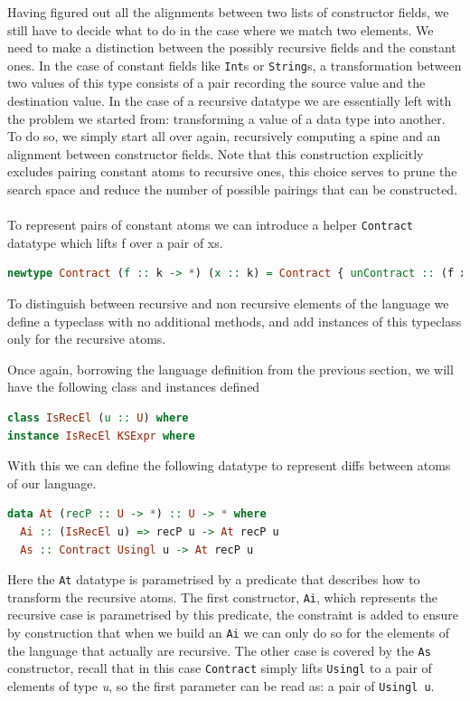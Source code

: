 \documentclass[11pt]{article}
\begin{document}
Having figured out all the alignments between two lists of constructor
fields, we still have to decide what to do in the case where we match two
elements. We need to make a distinction between the possibly
recursive fields and the constant ones.
In the case of constant fields
like \texttt{Int}s or \texttt{String}s, a transformation between two
values of this type consists of a pair recording the source value and the
destination value. In the case of a recursive datatype we are
essentially left with the problem we started from: transforming a value
of a data type into another. To do so, we simply start all over again,
recursively computing a spine and an alignment between constructor
fields. Note that this construction explicitly excludes pairing constant atoms 
to recursive ones, this choice serves to prune the search space and reduce the 
number of possible pairings that can be constructed.
\\\\
To represent pairs of constant atoms we can introduce a helper \texttt{Contract} datatype which 
lifts f over a pair of xs.

\begin{lstlisting}[language=haskell]
  newtype Contract (f :: k -> *) (x :: k) = Contract { unContract :: (f x , f x) }
\end{lstlisting}

To distinguish between recursive and non recursive elements of the language we 
define a typeclass with no additional methods, and add instances of this typeclass only for the recursive atoms.

Once again, borrowing the language definition from the previous section, we will have the following 
class and instances defined
\begin{lstlisting}[language=haskell]
class IsRecEl (u :: U) where
instance IsRecEl KSExpr where
\end{lstlisting}

With this we can define the following datatype to represent diffs between atoms of our language.
\begin{lstlisting}[language=haskell]
data At (recP :: U -> *) :: U -> * where
  Ai :: (IsRecEl u) => recP u -> At recP u
  As :: Contract Usingl u -> At recP u
\end{lstlisting}

Here the \texttt{At} datatype is parametrised by a predicate that describes how 
to transform the recursive atoms. 
The first constructor, \texttt{Ai}, which represents the recursive case is 
parametrised by this predicate, the constraint is added to ensure by construction 
that when we build an \texttt{Ai} we can only do so for the elements of the 
language that actually are recursive.
The other case is covered by the \texttt{As} constructor, recall that in this case \texttt{Contract} simply lifts 
\texttt{Usingl} to a pair of elements of type \emph{u}, so the first parameter 
can be read as: a pair of \texttt{Usingl u}.
\end{document}
